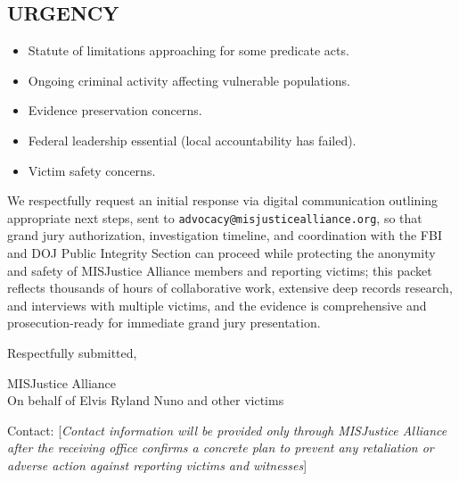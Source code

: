 \documentclass[12pt,oneside]{article}
\begin{document}
\begin{flushleft}
\section*{URGENCY}

\begin{itemize}
\item Statute of limitations approaching for some predicate acts.
\item Ongoing criminal activity affecting vulnerable populations.
\item Evidence preservation concerns.
\item Federal leadership essential (local accountability has failed).
\item Victim safety concerns.
\end{itemize}

We respectfully request an initial response via digital communication outlining appropriate next steps, sent to \texttt{advocacy@misjusticealliance.org}, so that grand jury authorization, investigation timeline, and coordination with the FBI and DOJ Public Integrity Section can proceed while protecting the anonymity and safety of MISJustice Alliance members and reporting victims; this packet reflects thousands of hours of collaborative work, extensive deep records research, and interviews with multiple victims, and the evidence is comprehensive and prosecution-ready for immediate grand jury presentation.

\vspace{0.3in}

\noindent
Respectfully submitted,

\vspace{0.3in}

\noindent
MISJustice Alliance \\
On behalf of Elvis Ryland Nuno and other victims

\vspace{0.2in}

\noindent
Contact: [\textit{Contact information will be provided only through MISJustice Alliance after the receiving office confirms a concrete plan to prevent any retaliation or adverse action against reporting victims and witnesses}]

\end{flushleft}
\end{document}
